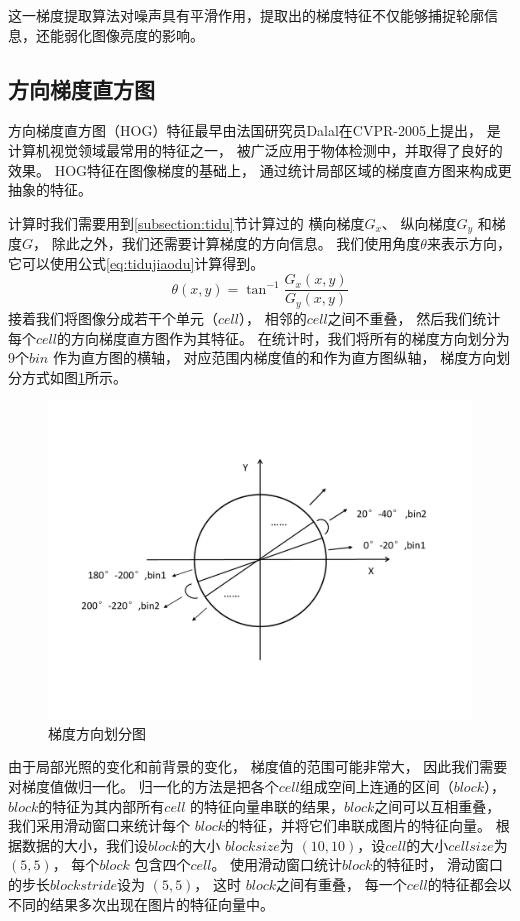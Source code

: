这一梯度提取算法对噪声具有平滑作用，提取出的梯度特征不仅能够捕捉轮廓信息，还能弱化图像亮度的影响。

\subsection{方向梯度直方图}\label{subsection:tiquzhifangtu}

方向梯度直方图\cite{dalal2005histograms}（HOG）特征最早由法国研究员Dalal在CVPR-2005上提出，
是计算机视觉领域最常用的特征之一，
被广泛应用于物体检测中，并取得了良好的效果。
HOG特征在图像梯度的基础上，
通过统计局部区域的梯度直方图来构成更抽象的特征。

计算时我们需要用到\ref{subsection:tidu}节计算过的
横向梯度$G_x$、
纵向梯度$G_y$
和梯度$G$，
除此之外，我们还需要计算梯度的方向信息。
我们使用角度$\theta$来表示方向，
它可以使用公式\eqref{eq:tidujiaodu}计算得到。
\begin{equation}
\label{eq:tidujiaodu}
\theta (x,y)={\tan^{-1}{\frac{G_x(x,y)}{G_y(x,y)}}}
\end{equation}
接着我们将图像分成若干个单元（$cell$），
相邻的$cell$之间不重叠，
然后我们统计每个$cell$的方向梯度直方图作为其特征。
在统计时，我们将所有的梯度方向划分为9个$bin$
作为直方图的横轴，
对应范围内梯度值的和作为直方图纵轴，
梯度方向划分方式如图\ref{fig:tiduhuafentu}所示。
\begin{figure}[htbp]
\centering
\includegraphics[width=0.8\linewidth]{figures/gradient.pdf}
\caption{梯度方向划分图}
\label{fig:tiduhuafentu}
\end{figure}
由于局部光照的变化和前背景的变化，
梯度值的范围可能非常大，
因此我们需要对梯度值做归一化。
归一化的方法是把各个$cell$组成空间上连通的区间（$block$），
$block$的特征为其内部所有$cell$
的特征向量串联的结果，$block$之间可以互相重叠，我们采用滑动窗口来统计每个
$block$的特征，并将它们串联成图片的特征向量。
根据数据的大小，我们设$block$的大小
$blocksize$为
$(10,10)$，设$cell$的大小$cellsize$为
$(5,5)$，
每个$block$
包含四个$cell$。
使用滑动窗口统计$block$的特征时，
滑动窗口的步长$blockstride$设为
$(5,5)$，
这时
$block$之间有重叠，
每一个$cell$的特征都会以不同的结果多次出现在图片的特征向量中。

